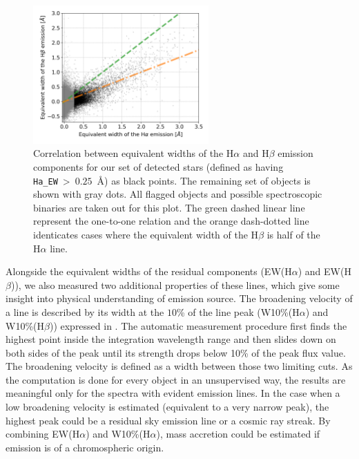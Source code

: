 \begin{figure}
	\centering
	\includegraphics[width=0.6\textwidth]{H_emission_EW_dist_all.png}
	\caption{Correlation between equivalent widths of the H$\alpha$ and H$\beta$ emission components for our set of detected stars (defined as having \texttt{Ha\_EW}~>~$0.25$~\AA) as black points. The remaining set of objects is shown with gray dots. All flagged objects and possible spectroscopic binaries are taken out for this plot. The green dashed linear line represent the one-to-one relation and the orange dash-dotted line identicates cases where the equivalent width of the H$\beta$ is half of the H$\alpha$ line.}
	\label{fig:hab_EW}
\end{figure}

Alongside the equivalent widths of the residual components (EW(H$\alpha$) and EW(H$\beta$)), we also measured two additional properties of these lines, which give some insight into physical understanding of emission source. The broadening velocity of a line is described by its width at the $10$\% of the line peak (W10\%(H$\alpha$) and W10\%(H$\beta$)) expressed in \kms. The automatic measurement procedure first finds the highest point inside the integration wavelength range and then slides down on both sides of the peak until its strength drops below 10\% of the peak flux value. The broadening velocity is defined as a width between those two limiting cuts. As the computation is done for every object in an unsupervised way, the results are meaningful only for the spectra with evident emission lines. In the case when a low broadening velocity is estimated (equivalent to a very narrow peak), the highest peak could be a residual sky emission line or a cosmic ray streak. By combining EW(H$\alpha$) and W10\%(H$\alpha$), mass accretion could be estimated if emission is of a chromospheric origin.

